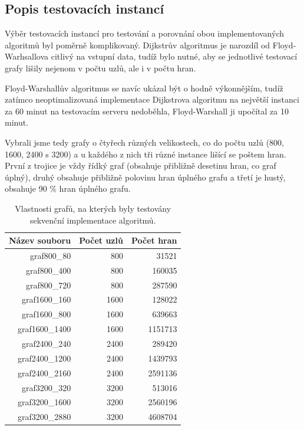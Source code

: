 \documentclass[a4paper,11pt]{article}
\begin{document}
\subsection{Popis testovacích instancí}
Výběr testovacích instancí pro testování a porovnání obou implementovaných algoritmů byl poměrně komplikovaný. Dijkstrův algoritmus je narozdíl od Floyd-Warhsallova citlivý na vstupní data, tudíž bylo nutné, aby se jednotlivé testovací grafy lišily nejenom v počtu uzlů, ale i v počtu hran. 
\par
Floyd-Warshallův algoritmus se navíc ukázal být o hodně výkonnějším, tudíž zatímco neoptimalizovaná implementace Dijkstrova algoritmu na nej\-větší instanci za 60 minut na testovacím serveru nedoběhla, Floyd-Warshall ji upočítal za 10 minut.
\par
Vybrali jsme tedy grafy o čtyřech různých velikostech, co do počtu uzlů (800, 1600, 2400 s 3200) a u každého z nich tři různé instance lišící se poštem hran. První z trojice je vždy řídký graf (obsahuje přibližně desetinu hran, co graf úplný), druhý obsahuje přibližně polovinu hran úplného grafu a třetí je hustý, obsahuje 90 \% hran úplného grafu.
\begin{table}[H]
  \begin{center}
      \begin{tabular}{|r|r|r|}
      \hline
      Název souboru 	& Počet uzlů  	& Počet hran  		\\ \hline
      graf800\_80  	& 800    	& 31521             	\\ \hline
      graf800\_400     	& 800    	& 160035        	\\ \hline
      graf800\_720  	& 800    	& 287590             	\\ \hline
      graf1600\_160    	& 1600    	& 128022          	\\ \hline
      graf1600\_800  	& 1600    	& 639663             	\\ \hline
      graf1600\_1400   	& 1600    	& 1151713          	\\ \hline
      graf2400\_240  	& 2400    	& 289420             	\\ \hline
      graf2400\_1200   	& 2400    	& 1439793          	\\ \hline
      graf2400\_2160  	& 2400    	& 2591136             	\\ \hline
      graf3200\_320    	& 3200    	& 513016          	\\ \hline
      graf3200\_1600  	& 3200    	& 2560196             	\\ \hline
      graf3200\_2880   	& 3200    	& 4608704          	\\ \hline
      \end{tabular}
  \caption{Vlastnosti grafů, na kterých byly testovány sekvenční implementace algoritmů.}
  \label{tab:instance}
  \end{center}
\end{table}
\end{document}
